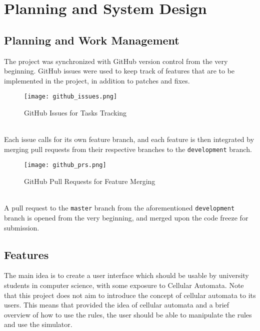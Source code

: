 \chapter{Planning and System Design}

\section{Planning and Work Management}
The project was synchronized with GitHub version control from the very beginning. GitHub issues were used to keep track of features that are to be implemented in the project, in addition to patches and fixes. 
\begin{figure}[h]
    \caption{GitHub Issues for Tasks Tracking}
    \centering
    \texttt{[image: github\_issues.png]}
\end{figure}
\\ 
Each issue calls for its own feature branch, and each feature is then integrated by merging pull requests from their respective branches to the \texttt{development} branch. \\
\begin{figure}[h]
    \caption{GitHub Pull Requests for Feature Merging}
    \centering
    \texttt{[image: github\_prs.png]}
\end{figure}
\\ 
A pull request to the \texttt{master} branch from the aforementioned \texttt{development} branch is opened from the very beginning, and merged upon the code freeze for submission.

\section{Features}
The main idea is to create a user interface which should be usable by university students in computer science, with some exposure to Cellular Automata. Note that this project does not aim to introduce the concept of cellular automata to its users. This means that provided the idea of cellular automata and a brief overview of how to use the rules, the user should be able to manipulate the rules and use the simulator.

